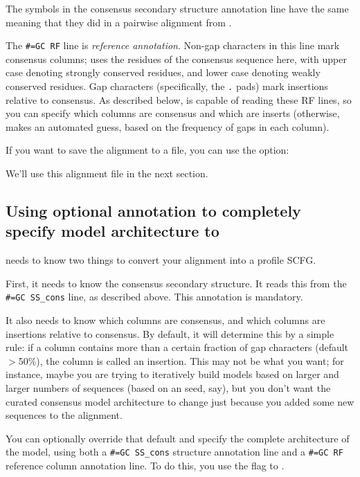 The symbols in the consensus secondary structure annotation line have
the same meaning that they did in a pairwise alignment from
.

The {\small\verb+#=GC RF+} line is \emph{reference
annotation}. Non-gap characters in this line mark consensus columns;
 uses the residues of the consensus sequence here, with
upper case denoting strongly conserved residues, and lower case
denoting weakly conserved residues. Gap characters (specifically, the
\verb+.+ pads) mark insertions relative to consensus. As described
below,  is capable of reading these RF lines, so you can
specify which columns are consensus and which are inserts (otherwise,
 makes an automated guess, based on the frequency of
gaps in each column).

If you want to save the alignment to a file, you can use the 
option:


We'll use this  alignment file in the next section.

\subsection{Using optional annotation to completely specify model architecture
to }

 needs to know two things to convert your alignment into
a profile SCFG.

First, it needs to know the consensus secondary structure. It reads
this from the {\small\verb+#=GC SS_cons+} line, as described
above. This annotation is mandatory.

It also needs to know which columns are consensus, and which columns
are insertions relative to consensus. By default, it will determine
this by a simple rule: if a column contains more than a certain
fraction of gap characters (default $>$50\%), the column is called an
insertion. This may not be what you want; for instance, maybe you are
trying to iteratively build models based on larger and larger numbers
of sequences (based on an  seed, say), but you don't
want the curated consensus model architecture to change just because
you added some new sequences to the alignment.

You can optionally override that default and specify the complete
architecture of the model, using both a {\small\verb+#=GC SS_cons+}
structure annotation line and a {\small\verb+#=GC RF+} reference
column annotation line.  To do this, you use the  flag to
.

